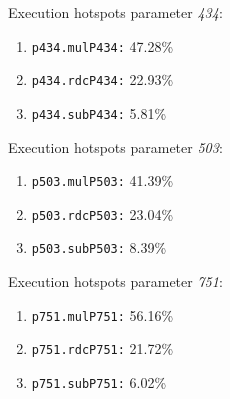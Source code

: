 Execution hotspots parameter \textit{434}:
\begin{enumerate}[noitemsep]
	\item \texttt{p434.mulP434:} 47.28\%
	\item \texttt{p434.rdcP434:} 22.93\%
	\item \texttt{p434.subP434:} 5.81\%
\end{enumerate}
Execution hotspots parameter \textit{503}:
\begin{enumerate}[noitemsep]
	\item \texttt{p503.mulP503:} 41.39\%
	\item \texttt{p503.rdcP503:} 23.04\%
	\item \texttt{p503.subP503:} 8.39\%
\end{enumerate}
Execution hotspots parameter \textit{751}:
\begin{enumerate}[noitemsep]
	\item \texttt{p751.mulP751:} 56.16\%
	\item \texttt{p751.rdcP751:} 21.72\%
	\item \texttt{p751.subP751:} 6.02\%
\end{enumerate}
